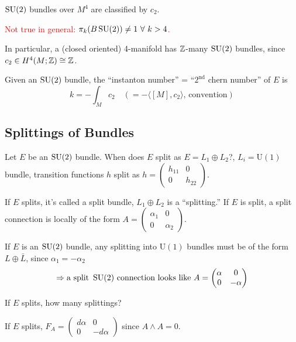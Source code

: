 \documentclass[main]{subfiles}
\begin{document}
\begin{theorem}
$\operatorname{SU}(2)$ bundles over $M^4$ are classified by $c_2$.

\textcolor{red}{Not true in general: $\pi_k(B\SU(2)) \neq 1\ \forall\ k>4$.}
\end{theorem}

In particular, a (closed oriented) 4-manifold has $\mathbb Z$-many $\operatorname{SU}(2)$ bundles, since $c_2 \in H^4(M;\mathbb Z)\cong \mathbb Z$.

\begin{definition}
Given an $\operatorname{SU}(2)$ bundle, the ``instanton number'' = ``$2^{\text{nd}}$ chern number'' of $E$ is
\[
k = -\int_M c_2 \quad \left(=-\langle [M],c_2\rangle\text{, convention}\right)
\]
\end{definition}

\subsection*{Splittings of Bundles}

Let $E$ be an $\operatorname{SU}(2)$ bundle. When does $E$ split as $E=L_1\oplus L_2$?, $L_i = \mathrm{U}(1)$ bundle, transition functions $h$ split as $h = \begin{pmatrix}h_{11}&0\\0&h_{22}\end{pmatrix}$.

If $E$ splits, it's called a split bundle, $L_1\oplus L_2$ is a ``splitting.'' If $E$ is split, a split connection is locally of the form $A = \begin{pmatrix}\alpha_1 & 0\\ 0 & \alpha_2\end{pmatrix}$.

If $E$ is an $\operatorname{SU}(2)$ bundle, any splitting into $\mathrm{U}(1)$ bundles must be of the form $L\oplus \bar L$, since $\alpha_1 = -\alpha_2$
\[
\Rightarrow \text{a split } \operatorname{SU}(2) \text{ connection looks like } A = \begin{pmatrix}\alpha & 0\\0&-\alpha\end{pmatrix}
\]

\begin{question}
If $E$ splits, how many splittings?
\end{question}

If $E$ splits, $F_A = \begin{pmatrix}d\alpha & 0\\0&-d\alpha\end{pmatrix}$ since $A\wedge A = 0$.
\end{document}
